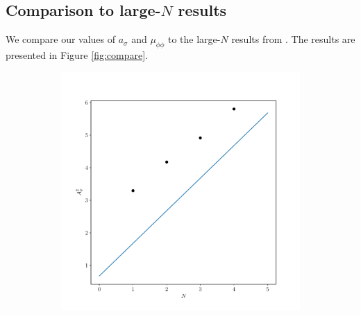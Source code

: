 \documentclass[a4paper,11pt]{article}
\begin{document}
\subsection{Comparison to large-$N$ results}
We compare our values of $a_\sigma$ and $\mu_{\phi\phi}$ to the large-$N$ results from \cite{Max}. The results are presented in Figure \ref{fig:compare}. 
\begin{figure}[H]

\begin{subfigure}{\columnwidth}
    \centering
    \includegraphics[scale=0.5]{AsigmaCompare.pdf}
\end{subfigure}
~


\end{figure}
\end{document}
